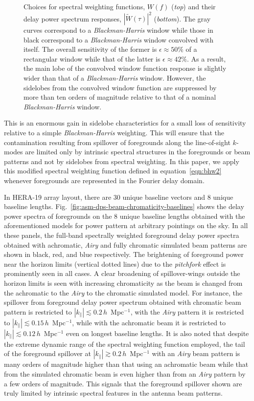 \documentclass[preprint2,iop,numberedappendix,twocolappendix,appendixfloats]{emulateapj}
\begin{document}
\begin{figure}[htb]
  \caption{Choices for spectral weighting functions, $W(f)$ ({\it top}) and their delay power spectrum responses, $|\widetilde{W}(\tau)|^2$ ({\it bottom}). The gray curves correspond to a {\it Blackman-Harris} window while those in black correspond to a {\it Blackman-Harris} window convolved with itself. The overall sensitivity of the former is $\epsilon \approx 50\%$ of a rectangular window while that of the latter is $\epsilon \approx 42\%$. As a result, the main lobe of the convolved window function response is slightly wider than that of a {\it Blackman-Harris} window. However, the sidelobes from the convolved window function are suppressed by more than ten orders of magnitude relative to that of a nominal {\it Blackman-Harris} window.}
  \label{fig:window-functions}
\end{figure}

This is an enormous gain in sidelobe characteristics for a small loss of sensitivity relative to a simple {\it Blackman-Harris} weighting. This will ensure that the contamination resulting from spillover of foregrounds along the line-of-sight $k$-modes are limited only by intrinsic spectral structures in the foregrounds or beam patterns and not by sidelobes from spectral weighting. In this paper, we apply this modified spectral weighting function defined in equation~\ref{eqn:bhw2} whenever foregrounds are represented in the Fourier delay domain. 

In HERA-19 array layout, there are 30 unique baseline vectors and 8 unique baseline lengths. Fig.~\ref{fig:asm-dps-beam-chromaticity-baselines} shows the delay power spectra of foregrounds on the 8 unique baseline lengths obtained with the aforementioned models for power pattern at arbitrary pointings on the sky. In all these panels, the full-band spectrally weighted foreground delay power spectra obtained with achromatic, {\it Airy} and fully chromatic simulated beam patterns are shown in black, red, and blue respectively. The brightening of foreground power near the horizon limits (vertical dotted lines) due to the {\it pitchfork} effect \citep{thy15a,thy15b} is prominently seen in all cases. A clear broadening of spillover-wings outside the horizon limits is seen with increasing chromaticity as the beam is changed from the achromatic to the {\it Airy} to the chromatic simulated model. For instance, the spillover from foreground delay power spectrum obtained with chromatic beam pattern is restricted to $|k_\parallel| \lesssim 0.2\,h$~Mpc$^{-1}$, with the {\it Airy} pattern it is restricted to $|k_\parallel| \lesssim 0.15\,h$~Mpc$^{-1}$, while with the achromatic beam it is restricted to $|k_\parallel| \lesssim 0.12\,h$~Mpc$^{-1}$ even on longest baseline lengths. It is also noted that despite the extreme dynamic range of the spectral weighting function employed, the tail of the foreground spillover at $|k_\parallel| \gtrsim 0.2\,h$~Mpc$^{-1}$ with an {\it Airy} beam pattern is many orders of magnitude higher than that using an achromatic beam while that from the simulated chromatic beam is even higher than from an {\it Airy} pattern by a few orders of magnitude. This signals that the foreground spillover shown are truly limited by intrinsic spectral features in the antenna beam patterns. 
\end{document}
